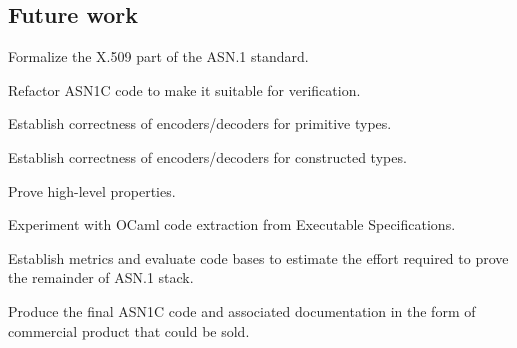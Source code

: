 \documentclass{article}
\begin{document}
\subsection{Future work}
  Formalize the X.509 part of the ASN.1 standard.  
   
  Refactor ASN1C code to make it suitable for verification.

  Establish correctness of encoders/decoders for primitive types.

  Establish correctness of encoders/decoders for constructed types.

  Prove high-level properties.

  Experiment with OCaml code extraction from Executable Specifications.

  Establish metrics and evaluate code bases to estimate the effort required to prove the remainder of ASN.1 stack.

  Produce the final ASN1C code and associated documentation in the form of commercial product that could be sold.
\end{document}
